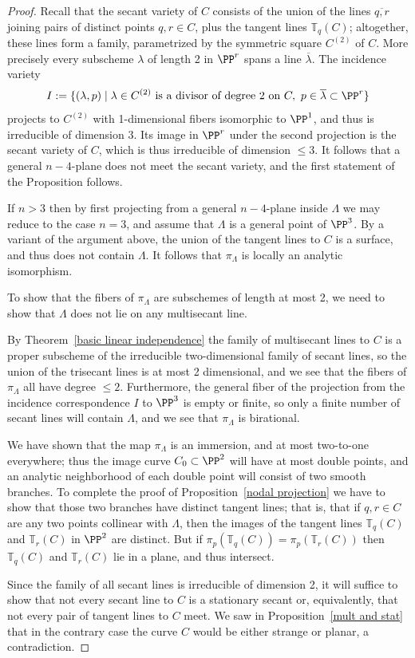 \begin{proof} Recall that the secant variety of $C$ consists of the union of the lines $\overline{q,r}$ joining pairs of distinct points $q,r \in C$, plus the tangent lines ${\mathbb T}_q(C)$; altogether, these lines form a family, parametrized by the symmetric square $C^{(2)}$ of $C$. More precisely every subscheme $\lambda$ of
length 2 in $\PP^r$ spans a line $\overline \lambda$. The incidence variety
$$
I:=\{(\lambda, p)\mid \lambda\in C^{(2)} \hbox{ is a divisor of degree 2 on }C,\ p\in \overline \lambda\subset\PP^r\}
$$
projects to $C^{(2)}$ with 1-dimensional fibers isomorphic to $\PP^1$, and thus
is irreducible of dimension 3. Its image in $\PP^r$ under the second projection
is the secant variety of $C$, which is thus irreducible of dimension $\leq 3$.
It follows that a general
$n-4$-plane does not meet the secant variety, and the first statement of the Proposition follows.

If $n>3$ then by first projecting from a general $n-4$-plane inside $\Lambda$ we may reduce to the case $n=3$, and assume that $\Lambda$ is a general point of $\PP^3$. By a variant of the argument above, the union 
of the tangent lines to $C$ is a surface, and thus does not contain $\Lambda$.
It follows that $\pi_\Lambda$ is locally an analytic isomorphism.

To show that the fibers of $\pi_\Lambda$ are subschemes of length at most 2,
we need to show that $\Lambda$ does not lie on any multisecant line. 

By Theorem~\ref{basic linear independence} the family of multisecant lines to $C$ is a proper subscheme of the irreducible two-dimensional family of secant lines, so the union of the trisecant lines is at most 2 dimensional, and we see that the fibers of $\pi_\Lambda$ all have degree $\leq 2$. Furthermore, the general fiber of the projection
from the incidence correspondence $I$ to $\PP^3$ is empty or finite, so only a finite number of secant lines will contain $\Lambda$, and we see that $\pi_\Lambda$ is birational. 

We have shown that the map $\pi_\Lambda$ is an immersion, and at most two-to-one everywhere; thus the image curve $C_0 \subset \PP^2$ will have at most double points, and an analytic neighborhood of each double point will consist of two smooth branches. To complete the proof of Proposition~\ref{nodal projection} we have to show that those two branches have distinct tangent lines; that is, that
if $q, r \in C$ are any two points collinear with $\Lambda$, then the images of the tangent lines ${\mathbb T}_q(C)$ and ${\mathbb T}_r(C)$ in $\PP^2$ are distinct. But if  $\pi_p({\mathbb T}_q(C)) = \pi_p({\mathbb T}_r(C))$ then  ${\mathbb T}_q(C)$ and ${\mathbb T}_r(C)$ lie in a plane, and thus intersect.

Since the family of all secant lines is irreducible of dimension 2,  it will suffice to show that not every secant line to $C$ is a stationary secant or, equivalently, that not every pair of tangent lines to $C$ meet. We saw in Proposition~\ref{mult and stat} that in the contrary case the curve $C$ would be either strange or planar, a contradiction.
\end{proof}


